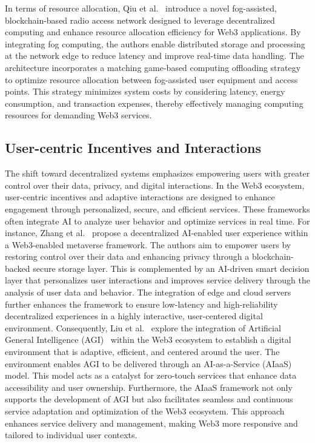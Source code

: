 \documentclass[5p,twocolumn]{elsarticle}
\begin{document}
In terms of resource allocation, Qiu et al.~\cite{qiu2023fog} introduce a novel fog-assisted, blockchain-based radio access network designed to leverage decentralized computing and enhance resource allocation efficiency for Web3 applications. By integrating fog computing, the authors enable distributed storage and processing at the network edge to reduce latency and improve real-time data handling. The architecture incorporates a matching game-based computing offloading strategy to optimize resource allocation between fog-assisted user equipment and access points. This strategy minimizes system costs by considering latency, energy consumption, and transaction expenses, thereby effectively managing computing resources for demanding Web3 services.

\subsection{User-centric Incentives and Interactions}
The shift toward decentralized systems emphasizes empowering users with greater control over their data, privacy, and digital interactions. In the Web3 ecosystem, user-centric incentives and adaptive interactions are designed to enhance engagement through personalized, secure, and efficient services. These frameworks often integrate AI to analyze user behavior and optimize services in real time. For instance, Zhang et al.~\cite{zhang2023ai} propose a decentralized AI-enabled user experience within a Web3-enabled metaverse framework. The authors aim to empower users by restoring control over their data and enhancing privacy through a blockchain-backed secure storage layer. This is complemented by an AI-driven smart decision layer that personalizes user interactions and improves service delivery through the analysis of user data and behavior. The integration of edge and cloud servers further enhances the framework to ensure low-latency and high-reliability decentralized experiences in a highly interactive, user-centered digital environment. Consequently, Liu et al.~\cite{liu2023web3} explore the integration of Artificial General Intelligence (AGI)~\cite{goertzel2014artificial} within the Web3 ecosystem to establish a digital environment that is adaptive, efficient, and centered around the user. The environment enables AGI to be delivered through an AI-as-a-Service (AIaaS) model. This model acts as a catalyst for zero-touch services that enhance data accessibility and user ownership. Furthermore, the AIaaS framework not only supports the development of AGI but also facilitates seamless and continuous service adaptation and optimization of the Web3 ecosystem. This approach enhances service delivery and management, making Web3 more responsive and tailored to individual user contexts.
\end{document}
